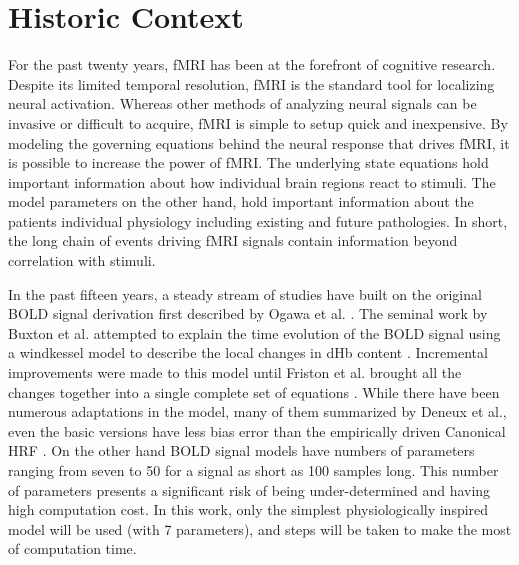 \section{Historic Context}
\acresetall
For the past twenty years, \ac{fMRI}
has been at the forefront of cognitive research. Despite its
limited temporal resolution, \ac{fMRI} is the standard tool for localizing 
neural activation.  Whereas other methods
of analyzing neural signals can be invasive or difficult to acquire, 
\ac{fMRI} is simple to setup quick and inexpensive.
By modeling the governing equations behind the neural response that
drives \ac{fMRI}, it is possible to increase the power of \ac{fMRI}.
The underlying state equations hold important information
about how individual brain regions react to stimuli. The model parameters
on the other hand, hold important information about the patients individual
physiology including existing and future pathologies. In short,
the long chain of events driving \ac{fMRI} signals contain information 
beyond correlation with stimuli.

In the past fifteen years, a steady stream of studies have built
on the original \ac{BOLD} signal 
derivation first described by Ogawa et al. \cite{Ogawa}.
The seminal work by Buxton et al. attempted to explain the
time evolution of the \ac{BOLD} signal using a windkessel model to
describe the local changes in \ac{dHb} content \cite{Buxton1998}.
Incremental improvements were made to this model until Friston et al.
brought all the changes together into a single complete 
set of equations \cite{Friston2000}. While there have been numerous adaptations in the model, 
many of them summarized by Deneux et al., even the basic versions
have less bias error than the empirically driven Canonical \ac{HRF}
\cite{Deneux2006,Handwerker2004}.
On the other hand \ac{BOLD} signal models have numbers
of parameters ranging from seven \cite{Riera2004} to 50 \cite{Behzadi2005} 
for a signal as short as 100 samples long. This number of parameters presents
a significant risk of being under-determined and having high computation cost. 
In this work, only the simplest physiologically inspired model will be
used (with 7 parameters), and steps will be taken to make the most of computation
time.

